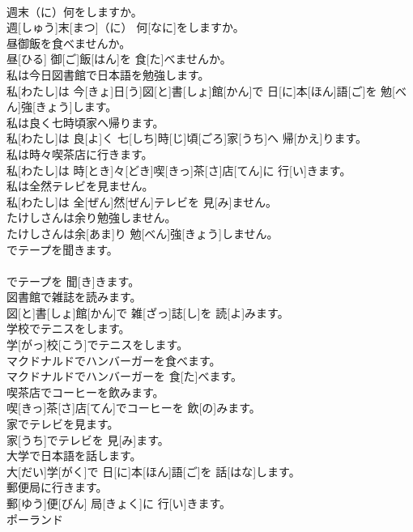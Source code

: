 \documentclass[8pt]{extreport}
\begin{document}
\begin{CJK}{UTF8}{min}
\\	週末（に）何をしますか。	
\\	週[しゅう]末[まつ]（に） 何[なに]をしますか。
\\	昼御飯を食べませんか。	
\\	昼[ひる] 御[ご]飯[はん]を 食[た]べませんか。
\\	私は今日図書館で日本語を勉強します。	
\\	私[わたし]は 今[きょ]日[う]図[と]書[しょ]館[かん]で 日[に]本[ほん]語[ご]を 勉[べん]強[きょう]します。
\\	私は良く七時頃家へ帰ります。	
\\	私[わたし]は 良[よ]く 七[しち]時[じ]頃[ごろ]家[うち]へ 帰[かえ]ります。
\\	私は時々喫茶店に行きます。	
\\	私[わたし]は 時[とき]々[どき]喫[きっ]茶[さ]店[てん]に 行[い]きます。
\\	私は全然テレビを見ません。	
\\	私[わたし]は 全[ぜん]然[ぜん]テレビを 見[み]ません。
\\	たけしさんは余り勉強しません。	
\\	たけしさんは余[あま]り 勉[べん]強[きょう]しません。
\\	でテープを聞きます。	
\\	[エル]
\\	[エル]でテープを 聞[き]きます。
\\	図書館で雑誌を読みます。	
\\	図[と]書[しょ]館[かん]で 雑[ざっ]誌[し]を 読[よ]みます。
\\	学校でテニスをします。	
\\	学[がっ]校[こう]でテニスをします。
\\	マクドナルドでハンバーガーを食べます。	
\\	マクドナルドでハンバーガーを 食[た]べます。
\\	喫茶店でコーヒーを飲みます。	
\\	喫[きっ]茶[さ]店[てん]でコーヒーを 飲[の]みます。
\\	家でテレビを見ます。	
\\	家[うち]でテレビを 見[み]ます。
\\	大学で日本語を話します。	
\\	大[だい]学[がく]で 日[に]本[ほん]語[ご]を 話[はな]します。
\\	郵便局に行きます。	
\\	郵[ゆう]便[びん] 局[きょく]に 行[い]きます。
\\	ポーランド	

\end{CJK}
\end{document}
